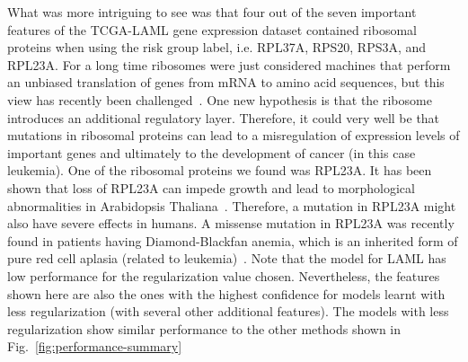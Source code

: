 What was more intriguing to see was that four out of the seven important features of the TCGA-LAML gene expression dataset contained ribosomal proteins when using the risk group label, i.e. RPL37A, RPS20, RPS3A, and RPL23A. For a long time ribosomes were just considered machines that perform an unbiased translation of genes from mRNA to amino acid sequences, but this view has recently been challenged~\cite{Xue2012}. One new hypothesis is that the ribosome introduces an additional regulatory layer. Therefore, it could very well be that mutations in ribosomal proteins can lead to a misregulation of expression levels of important genes and ultimately to the development of cancer (in this case leukemia). One of the ribosomal proteins we found was RPL23A. It has been shown that loss of RPL23A can impede growth and lead to morphological abnormalities in Arabidopsis Thaliana~\cite{Xue2012}. Therefore, a mutation in RPL23A might also have severe effects in humans. A missense mutation in RPL23A was recently found in patients having Diamond-Blackfan anemia, which is an inherited form of pure red cell aplasia (related to leukemia)~\cite{Gazda2012}. Note that the model for LAML has low performance for the regularization value chosen. Nevertheless, the features shown here are also the ones with the highest confidence for models learnt with less regularization (with several other additional features). The models with less regularization show similar performance to the other methods shown in Fig.~\ref{fig:performance-summary}

